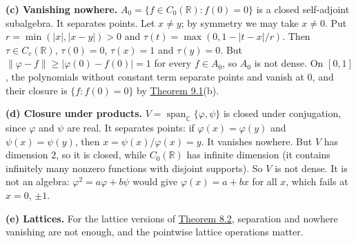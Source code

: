 \documentclass[
  english,
  11pt,
  a4paper,
]{article}
\begin{document}
\textbf{(c) Vanishing nowhere.} \(A_0=\{f\in C_0(\mathbb R):f(0)=0\}\)
is a closed self-adjoint subalgebra. It separates points. Let
\(x\neq y\); by symmetry we may take \(x\neq0\). Put
\(r=\min(|x|,|x-y|)>0\) and \(\tau(t)=\max(0,1-|t-x|/r)\). Then
\(\tau\in C_c(\mathbb R)\), \(\tau(0)=0\), \(\tau(x)=1\) and
\(\tau(y)=0\). But \(\|\varphi-f\|\geq|\varphi(0)-f(0)|=1\) for every
\(f\in A_0\), so \(A_0\) is not dense. On \([0,1]\), the polynomials
without constant term separate points and vanish at \(0\), and their
closure is \(\{f:f(0)=0\}\) by
\hyperlink{the-stone-weierstrass-theorem-for-functions-vanishing-at-infinity--oa-fnd-sw-07}{Theorem
9.1}(b).

\textbf{(d) Closure under products.}
\(V=\operatorname{span}_{\mathbb C}\{\varphi,\psi\}\) is closed under
conjugation, since \(\varphi\) and \(\psi\) are real. It separates
points: if \(\varphi(x)=\varphi(y)\) and \(\psi(x)=\psi(y)\), then
\(x=\psi(x)/\varphi(x)=y\). It vanishes nowhere. But \(V\) has dimension
\(2\), so it is closed, while \(C_0(\mathbb R)\) has infinite dimension
(it contains infinitely many nonzero functions with disjoint supports).
So \(V\) is not dense. It is not an algebra:
\(\varphi^2=a\varphi+b\psi\) would give \(\varphi(x)=a+bx\) for all
\(x\), which fails at \(x=0\), \(\pm1\).

\textbf{(e) Lattices.} For the lattice versions of
\hyperlink{the-stone-weierstrass-theorem-for-functions-vanishing-at-infinity--oa-fnd-sw-06}{Theorem
8.2}, separation and nowhere vanishing are not enough, and the pointwise
lattice operations matter.
\end{document}

